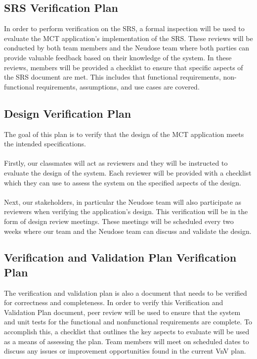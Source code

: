 \documentclass[12pt, titlepage]{article}
\begin{document}
\subsection{SRS Verification Plan}

In order to perform verification on the SRS, a formal inspection will be used to evaluate the MCT application’s implementation of the SRS. These reviews will be conducted by both team members and the Neudose team where both parties can provide valuable feedback based on their knowledge of the system. In these reviews, members will be provided a checklist to ensure that specific aspects of the SRS document are met. This includes that functional requirements, non-functional requirements, assumptions, and use cases are covered.



\subsection{Design Verification Plan}

The goal of this plan is to verify that the design of the MCT application meets the intended specifications.
\\\\
Firstly, our classmates will act as reviewers and they will be instructed to evaluate the design of the system. Each reviewer will be provided with a checklist which they can use to assess the system on the specified aspects of the design.
\\\\
Next, our stakeholders, in particular the Neudose team will also participate as reviewers when verifying the application’s design. This verification will be in the form of design review meetings. These meetings will be scheduled every two weeks where our team and the Neudose team can discuss and validate the design.


\subsection{Verification and Validation Plan Verification Plan}

The verification and validation plan is also a document that needs to be verified for correctness and completeness. In order to verify this Verification and Validation Plan document, peer review will be used to ensure that the system and unit tests for the functional and nonfunctional requirements are complete. To accomplish this, a checklist that outlines the key aspects to evaluate will be used as a means of assessing the plan. Team members will meet on scheduled dates to discuss any issues or improvement opportunities found in the current VnV plan.
\end{document}

